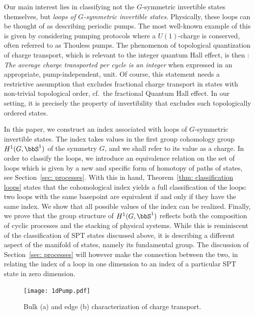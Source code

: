 Our main interest lies in classifying not the $G$-symmetric invertible states themselves, but \emph{loops of $G$-symmetric invertible states}. Physically, these loops can be thought of as describing periodic pumps. The most well-known example of this is given by considering pumping protocols where a $U(1)$-charge is conserved, often referred to as Thouless pumps.  The phenomenon of topological quantization of charge transport, which is relevant to the integer quantum Hall effect, is then \cite{thouless1983quantization,avron1994charge,De-Nittis:2016va,HastingsMichalakis,OurIndex,kapustin2020hall}:  \emph{The average charge transported per cycle is an integer} when expressed in an appropriate, pump-independent, unit. Of course, this statement needs a restrictive assumption that excludes fractional charge transport in states with non-trivial topological order, cf.\ the fractional Quantum Hall effect. In our setting, it is precisely the property of invertibility that excludes such topologically ordered states. 

In this paper, we construct an index associated with loops of $G$-symmetric invertible states. The index takes values in the first group cohomology group $H^1(G,\bbS^1)$ of the symmetry $G$, and we shall refer to its value as a charge. In order to classify the loops, we introduce an equivalence relation on the set of loops which is given by a new and specific form of homotopy of paths of states, see Section~\ref{sec: processes}. With this in hand, Theorem~\ref{thm: classification loops} states that the cohomological index yields a full classification of the loops: two loops with the same basepoint are equivalent if and only if they have the same index. We show that all possible values of the index can be realized. Finally, we prove that the group structure of $H^1(G,\bbS^1)$ reflects both the composition of cyclic processes and the stacking of physical systems. While this is reminiscent of the classification of SPT states discussed above, it is describing a different aspect of the manifold of states, namely its fundamental group. The discussion of Section~\ref{sec: processes} will however make the connection between the two, in relating the index of a loop in one dimension to an index of a particular SPT state in zero dimension. 
%
\begin{figure}[htb]
	\begin{center}
		\texttt{[image: 1dPump.pdf]}
		\caption{Bulk (a) and edge (b) characterization of charge transport.} \label{fig: edge_characterization}
	\end{center}
\end{figure} 
%

